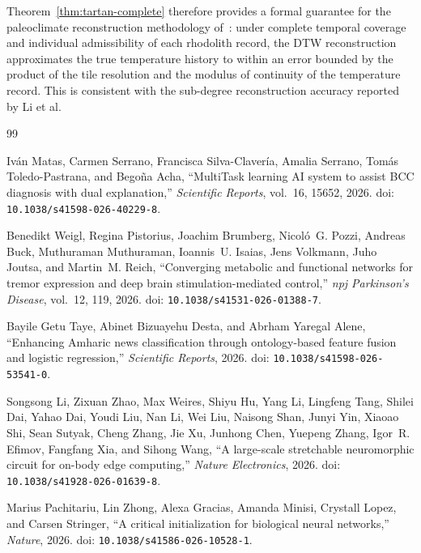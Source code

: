 \documentclass[11pt, oneside]{article}
\numberwithin{equation}{section}
\theoremstyle{rsvpstyle}
\theoremstyle{remark}
\begin{document}
Theorem~\ref{thm:tartan-complete} therefore provides a formal guarantee for the
paleoclimate reconstruction methodology of~\cite{Li2026Rhodoliths}: under complete
temporal coverage and individual admissibility of each rhodolith record, the DTW
reconstruction approximates the true temperature history to within an error bounded
by the product of the tile resolution and the modulus of continuity of the
temperature record. This is consistent with the sub-degree reconstruction accuracy
reported by Li et al.


\begin{thebibliography}{99}

Iv\'{a}n Matas, Carmen Serrano, Francisca Silva-Claver\'{i}a, Amalia Serrano,
Tom\'{a}s Toledo-Pastrana, and Bego\~{n}a Acha,
``MultiTask learning AI system to assist BCC diagnosis with dual explanation,''
\textit{Scientific Reports}, vol.~16, 15652, 2026.
doi: \texttt{10.1038/s41598-026-40229-8}.

Benedikt Weigl, Regina Pistorius, Joachim Brumberg, Nicol\'{o}~G. Pozzi,
Andreas Buck, Muthuraman Muthuraman, Ioannis~U. Isaias,
Jens Volkmann, Juho Joutsa, and Martin~M. Reich,
``Converging metabolic and functional networks for tremor expression and deep brain
stimulation-mediated control,''
\textit{npj Parkinson's Disease}, vol.~12, 119, 2026.
doi: \texttt{10.1038/s41531-026-01388-7}.

Bayile Getu Taye, Abinet Bizuayehu Desta, and Abrham Yaregal Alene,
``Enhancing Amharic news classification through ontology-based feature fusion and
logistic regression,''
\textit{Scientific Reports}, 2026.
doi: \texttt{10.1038/s41598-026-53541-0}.

Songsong Li, Zixuan Zhao, Max Weires, Shiyu Hu, Yang Li,
Lingfeng Tang, Shilei Dai, Yahao Dai, Youdi Liu, Nan Li,
Wei Liu, Naisong Shan, Junyi Yin, Xiaoao Shi, Sean Sutyak,
Cheng Zhang, Jie Xu, Junhong Chen, Yuepeng Zhang,
Igor~R. Efimov, Fangfang Xia, and Sihong Wang,
``A large-scale stretchable neuromorphic circuit for on-body edge computing,''
\textit{Nature Electronics}, 2026.
doi: \texttt{10.1038/s41928-026-01639-8}.

Marius Pachitariu, Lin Zhong, Alexa Gracias, Amanda Minisi,
Crystall Lopez, and Carsen Stringer,
``A critical initialization for biological neural networks,''
\textit{Nature}, 2026.
doi: \texttt{10.1038/s41586-026-10528-1}.


\end{thebibliography}
\end{document}
